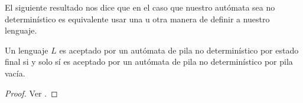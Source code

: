 \documentclass[tesis.tex]{subfiles}
\begin{document}
El siguiente resultado nos dice que en el caso que nuestro autómata sea no determinístico es equivalente usar una u otra manera de definir a nuestro lenguaje.

\medskip
\begin{teo}
	Un lenguaje $L$ es aceptado por un autómata de pila no determinístico por estado final si y solo sí es aceptado por un autómata de pila no determinístico por pila vacía.
\end{teo}

\begin{proof}
	Ver \cite{hopcraft-ullman}.
\end{proof}
\end{document}
